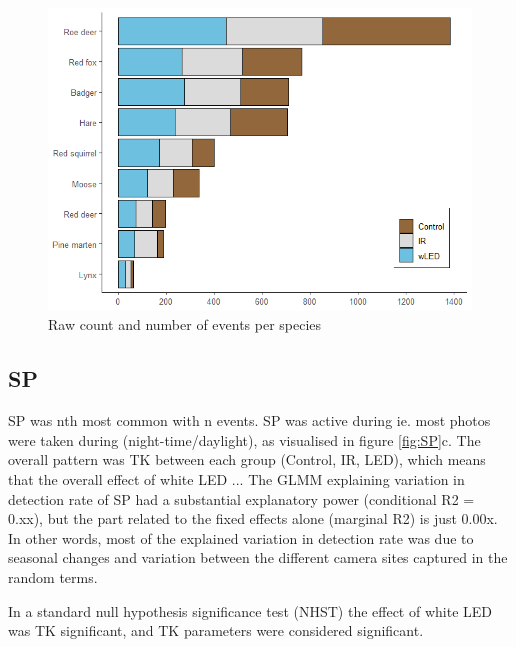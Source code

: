 %


\begin{figure}
 \centering
	\includegraphics[scale=.9]{../R/glmm_sp_files/figure-html/events-1.png}
 \caption[Raw count and number of events per species]
 {Raw count and number of events per species}
\end{figure}





\subsection{SP}

SP was nth most common with n events.
SP was active during 
ie. most photos were taken during (night-time/daylight), as visualised in figure \ref{fig:SP}c.
The overall pattern was TK between each group (Control, IR, LED), which means that the overall effect of white LED ...
The GLMM explaining variation in detection rate of SP had a substantial explanatory power (conditional R2 = 0.xx), but the part related to the fixed effects alone (marginal R2) is just 0.00x.
In other words, most of the explained variation in detection rate was due to seasonal changes and variation between the different camera sites captured in the random terms.

In a standard null hypothesis significance test (NHST) the effect of white LED was TK significant, and TK parameters were considered significant.

